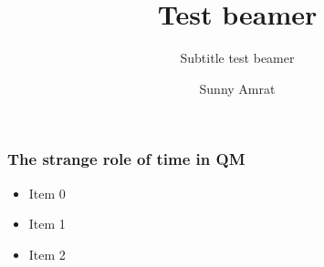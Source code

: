 \documentclass{beamer}
\title{Test beamer}
\subtitle{Subtitle test beamer}
\author{Sunny Amrat}
\begin{document}
\frame{\titlepage}
\begin{frame}
    \frametitle{The strange role of time in QM}
    \begin{itemize}
    	    		\item Item 0
    	    		\item Item 1
    	    		\item Item 2
    	    \end{itemize}
\end{frame}
\end{document}
